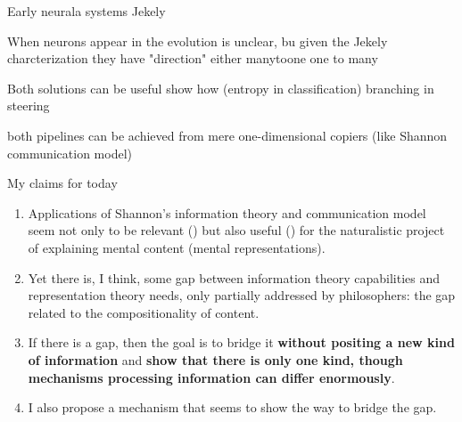 \documentclass[10pt, aspectratio=169]{beamer}
\begin{document}
\begin{frame}

Early neurala systems  Jekely 

When neurons appear in the evolution is unclear, bu given the Jekely charcterization they 
have "direction" either manytoone one to many 

Both solutions can be useful
show how (entropy in classification)
branching in steering 

both pipelines can be achieved from mere one-dimensional copiers (like Shannon communication model)

\end{frame}




\begin{frame}{My claims for today}
    
    \begin{center}
        
        
        \begin{enumerate}
            \item Applications of Shannon's information theory and communication model seem not only to be relevant (\cite{Mann2023}) but also useful (\cite{martinez_representations_2019}) for the naturalistic project of explaining mental content (mental representations).  
           
            \item Yet there is, I think, some gap between information theory capabilities and representation theory needs, only partially addressed by philosophers: the gap related to the compositionality of content. 
            \item If there is a gap, then the goal is to bridge it \textbf{without positing a new kind of information}  and \textbf{show that there is only one kind, though mechanisms processing information can differ enormously}. 
        
            \item I also propose a mechanism that seems to show the way to  bridge the gap.
                      
        \end{enumerate}
    \end{center}
\end{frame}
\end{document}
